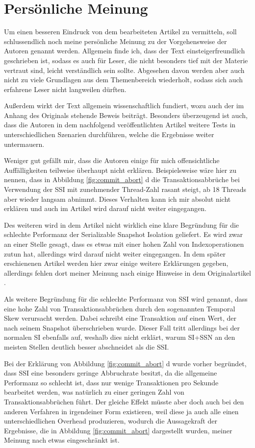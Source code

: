 \section{Persönliche Meinung}
\label{sec:persoenliche_meinung}

Um einen besseren Eindruck von dem bearbeiteten Artikel zu vermitteln, soll schlussendlich noch meine persönliche Meinung zu der Vorgehensweise der Autoren genannt werden.
Allgemein finde ich, dass der Text einsteigerfreundlich geschrieben ist, sodass es auch für Leser, die nicht besonders tief mit der Materie vertraut sind, leicht verständlich sein sollte.
Abgesehen davon werden aber auch nicht zu viele Grundlagen aus dem Themenbereich wiederholt, sodass sich auch erfahrene Leser nicht langweilen dürften.

Außerdem wirkt der Text allgemein wissenschaftlich fundiert, wozu auch der im Anhang des Originals stehende Beweis beiträgt.
Besonders überzeugend ist auch, dass die Autoren in dem nachfolgend veröffentlichten Artikel \cite{WangJFP16} weitere Tests in unterschiedlichen Szenarien durchführen, welche die Ergebnisse weiter untermauern.

Weniger gut gefällt mir, dass die Autoren einige für mich offensichtliche Auffälligkeiten teilweise überhaupt nicht erklären.
Beispielsweise wäre hier zu nennen, dass in Abbildung \ref{fig:commit_abort} d die Transaktionsabbrüche bei Verwendung der SSI mit zunehmender Thread-Zahl rasant steigt, ab 18 Threads aber wieder langsam abnimmt.
Dieses Verhalten kann ich mir absolut nicht erklären und auch im Artikel wird darauf nicht weiter eingegangen.

Des weiteren wird in dem Artikel nicht wirklich eine klare Begründung für die schlechte Performanz der Serializable Snapshot Isolation geliefert.
Es wird zwar an einer Stelle gesagt, dass es etwas mit einer hohen Zahl von Indexoperationen zutun hat, allerdings wird darauf nicht weiter eingegangen.
In dem später erschienenen Artikel \cite{WangJFP16} werden hier zwar einige weitere Erklärungen gegeben, allerdings fehlen dort meiner Meinung nach einige Hinweise in dem Originalartikel \cite{Wang:2015}.

Als weitere Begründung für die schlechte Performanz von SSI wird genannt, dass eine hohe Zahl von Transaktionsabbrüchen durch den sogenannten Temporal Skew verursacht werden.
Dabei schreibt eine Transaktion auf einen Wert, der nach seinem Snapshot überschrieben wurde. 
Dieser Fall tritt allerdings bei der normalen SI ebenfalls auf, weshalb dies nicht erklärt, warum SI+SSN an den meisten Stellen deutlich besser abschneidet als die SSI.

Bei der Erklärung von Abbildung \ref{fig:commit_abort} d wurde vorher begründet, dass SSI eine besonders geringe Abbruchrate besitzt, da die allgemeine Performanz so schlecht ist, dass nur wenige Transaktionen pro Sekunde bearbeitet werden, was natürlich zu einer geringen Zahl von Transaktionsabbrüchen führt.
Der gleiche Effekt müsste aber doch auch bei den anderen Verfahren in irgendeiner Form existieren, weil diese ja auch alle einen unterschiedlichen Overhead produzieren, wodurch die Aussagekraft der Ergebnisse, die in Abbildung \ref{fig:commit_abort} dargestellt wurden, meiner Meinung nach etwas eingeschränkt ist.
